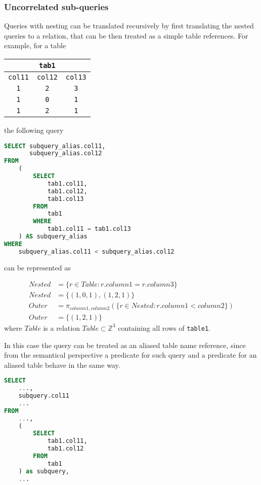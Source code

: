 \documentclass[magisterska,en]{pracamgr}
\newcommand{\code}[1]{\texttt{#1}}
\begin{document}
\subsubsection{Uncorrelated sub-queries}
Queries with nesting can be translated recursively by first translating the nested queries to a relation, that can be then treated as a simple table references. For example, for a table

\begin{center}
\begin{tabular}{|c|c|c|}
    \hline
    \multicolumn{3}{|c|}{\code{tab1}} \\
    \hline
    \code{col11} & \code{col12} & \code{col13} \\
    \hline
    \code{1} & \code{2} & \code{3} \\ 
    \code{1} & \code{0} & \code{1} \\ 
    \code{1} & \code{2} & \code{1} \\ 
    \hline
\end{tabular}
\end{center}
the following query

\begin{lstlisting}[language=SQL]
SELECT subquery_alias.col11,
       subquery_alias.col12
FROM
    (
        SELECT
            tab1.col11,
            tab1.col12,
            tab1.col13
        FROM
            tab1
        WHERE
            tab1.col11 = tab1.col13
    ) AS subquery_alias
WHERE
    subquery_alias.col11 < subquery_alias.col12
\end{lstlisting}
can be represented as


\begin{align*}
    Nested &= \{ r \in Table : r.column1 = r.column3 \}\\
    Nested &= \{ (1, 0, 1), (1, 2, 1) \}\\
    Outer &= \pi_{column1, column2} (\{ r \in Nested : r.column1 < column2 \})\\
    Outer &= \{ (1, 2, 1) \} 
\end{align*}
where $Table$ is a relation $Table \subset \mathbb{Z}^3$ containing all rows of \code{table1}.

In this case the query can be treated as an aliased table name reference, since from the semantical perspective a predicate for such query and a predicate for an aliased table behave in the same way.

\begin{lstlisting}[language=SQL]
SELECT
    ...,
    subquery.col11
    ...
FROM
    ...,
    (
        SELECT
            tab1.col11,
            tab1.col12
        FROM
            tab1
    ) as subquery,
    ...
\end{lstlisting}
\end{document}
